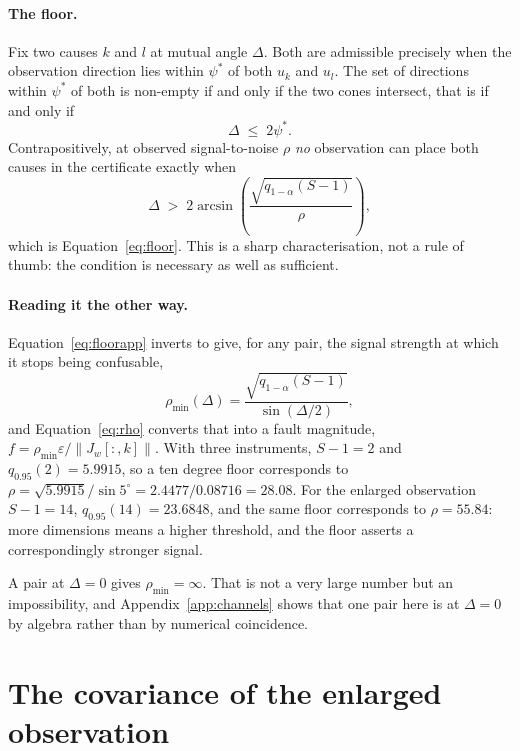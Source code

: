 \documentclass[preprint,12pt]{elsarticle}
\begin{document}
\paragraph{The floor.} Fix two causes $k$ and $l$ at mutual angle $\Delta$.
Both are admissible precisely when the observation direction lies within
$\psi^\ast$ of both $u_k$ and $u_l$. The set of directions within $\psi^\ast$ of
both is non-empty if and only if the two cones intersect, that is if and only if
%
\begin{equation}
\Delta \;\le\; 2 \psi^\ast .
\end{equation}
%
Contrapositively, at observed signal-to-noise $\rho$ \emph{no} observation can
place both causes in the certificate exactly when
%
\begin{equation}
\Delta \;>\; 2 \arcsin\!\left(
\frac{\sqrt{q_{1-\alpha}(S-1)}}{\rho}\right),
\label{eq:floorapp}
\end{equation}
%
which is Equation~\eqref{eq:floor}. This is a sharp characterisation, not a rule
of thumb: the condition is necessary as well as sufficient.

\paragraph{Reading it the other way.} Equation~\eqref{eq:floorapp} inverts to
give, for any pair, the signal strength at which it stops being confusable,
%
\begin{equation}
\rho_{\min}(\Delta) = \frac{\sqrt{q_{1-\alpha}(S-1)}}{\sin(\Delta/2)} ,
\end{equation}
%
and Equation~\eqref{eq:rho} converts that into a fault magnitude,
$f = \rho_{\min} \varepsilon / \lVert J_w[:,k] \rVert$. With three instruments,
$S - 1 = 2$ and $q_{0.95}(2) = 5.9915$, so a ten degree floor corresponds to
$\rho = \sqrt{5.9915}/\sin 5^\circ = 2.4477/0.08716 = 28.08$. For the enlarged
observation $S - 1 = 14$, $q_{0.95}(14) = 23.6848$, and the same floor
corresponds to $\rho = 55.84$: more dimensions means a higher threshold, and
the floor asserts a correspondingly stronger signal.

A pair at $\Delta = 0$ gives $\rho_{\min} = \infty$. That is not a very large
number but an impossibility, and Appendix~\ref{app:channels} shows that one pair
here is at $\Delta = 0$ by algebra rather than by numerical coincidence.


\section{The covariance of the enlarged observation}
\label{app:kron}
\end{document}
